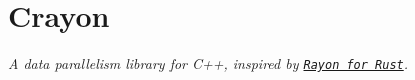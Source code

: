 \chapter{Crayon }
\hypertarget{index}{}\label{index}
\label{index_md_README}%
%


{\itshape A data parallelism library for C++, inspired by \href{https://docs.rs/rayon/latest/rayon/}{\texttt{Rayon for Rust}}.} 
